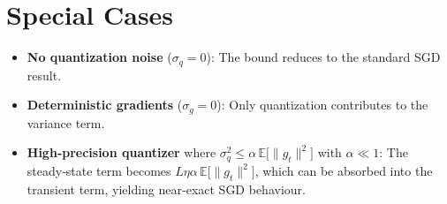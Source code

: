 \documentclass{article}
\newcommand{\E}{\mathbb{E}}
\begin{document}
\section*{Special Cases}
\begin{itemize}
\item \textbf{No quantization noise} ($\sigma_q=0$): The bound reduces to the standard SGD result.
\item \textbf{Deterministic gradients} ($\sigma_g=0$): Only quantization contributes to the variance term.
\item \textbf{High‑precision quantizer} where $\sigma_q^2\le\alpha\,\E\!\big[\|g_t\|^2\big]$ with $\alpha\ll1$: The steady‑state term becomes $L\eta\alpha\,\E\!\big[\|g_t\|^2\big]$, which can be absorbed into the transient term, yielding near‑exact SGD behaviour.
\end{itemize}
\end{document}
